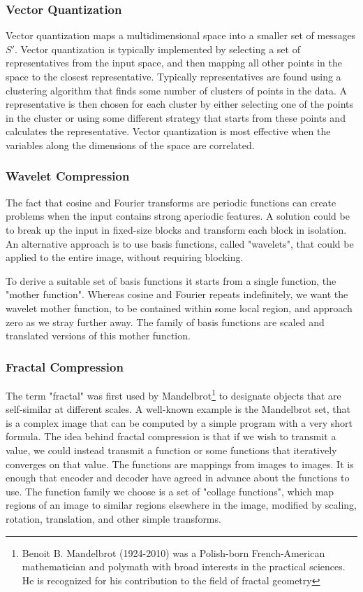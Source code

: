 \documentclass[12pt, a4paper]{report}
\begin{document}
\subsubsection{Vector Quantization}

Vector quantization maps a multidimensional space into a smaller set of messages \(S'\).
Vector quantization is typically implemented by selecting a set of representatives from the input space, and then mapping all
other points in the space to the closest representative.
Typically representatives are found using a clustering algorithm that finds some number of clusters of points in the data.
A representative is then chosen for each cluster by either selecting one of the points in the cluster or using some different
strategy that starts from these points and calculates the representative.
Vector quantization is most effective when the variables along the dimensions of the space are correlated.

\subsubsection{Wavelet Compression}

The fact that cosine and Fourier transforms are periodic functions can create problems when the input contains strong aperiodic
features.
A solution could be to break up the input in fixed-size blocks and transform each block in isolation.
An alternative approach is to use basis functions, called "wavelets", that could be applied to the entire image, without requiring
blocking.

To derive a suitable set of basis functions it starts from a single function, the "mother function".
Whereas cosine and Fourier repeats indefinitely, we want the wavelet mother function, to be contained within some local region,
and approach zero as we stray further away.
The family of basis functions are scaled and translated versions of this mother function.

\subsubsection{Fractal Compression}

The term "fractal" was first used by Mandelbrot\footnote{Benoit B. Mandelbrot (1924-2010) was a Polish-born French-American
mathematician and polymath with broad interests in the practical sciences. He is recognized for his contribution to the field of
fractal geometry} to designate objects that are self-similar at different scales.
A well-known example is the Mandelbrot set, that is a complex image that can be computed by a simple program with a very short
formula.
The idea behind fractal compression is that if we wish to transmit a value, we could instead transmit a function or some functions
that iteratively converges on that value.
The functions are mappings from images to images.
It is enough that encoder and decoder have agreed in advance about the functions to use.
The function family we choose is a set of "collage functions", which map regions of an image to similar regions elsewhere in the
image, modified by scaling, rotation, translation, and other simple transforms.
\end{document}
